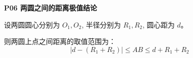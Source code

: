 \begin{statementbox}
\textbf{P06 两圆之间的距离极值结论}

设两圆圆心分别为 $O_1,O_2$,
半径分别为 $R_1,R_2$,
圆心距为 $d$。

则两圆上点之间距离的取值范围为：
\[
|d-(R_1+R_2)| \le AB \le d+R_1+R_2
\]
\end{statementbox}
